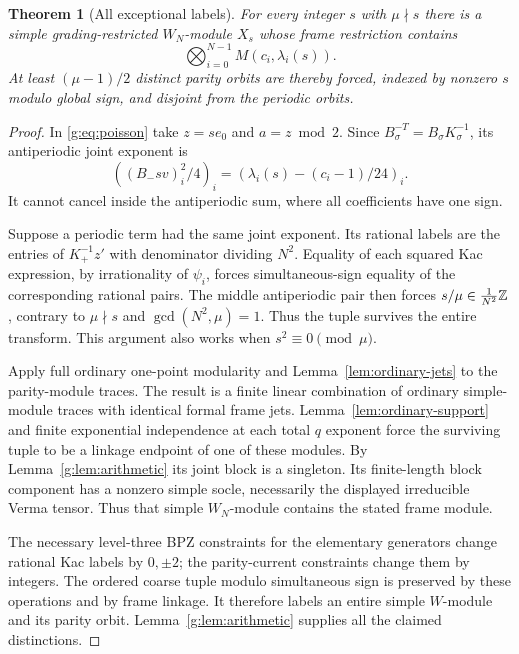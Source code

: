 \documentclass[11pt,a4paper]{article}
\numberwithin{equation}{section}
\newtheorem{theorem}{Theorem}[section]
\theoremstyle{definition}\newtheorem{definition}[theorem]{Definition}
\theoremstyle{remark}\newtheorem{remark}[theorem]{Remark}
\begin{document}
\begin{theorem}[All exceptional labels]\label{g:thm:alllabels}
For every integer $s$ with $\mu\nmid s$ there is a simple
grading-restricted $W_N$-module $X_s$ whose frame restriction contains
\[
       \bigotimes_{i=0}^{N-1} M(c_i,\lambda_i(s)).
\]
At least $(\mu-1)/2$ distinct parity orbits are thereby forced,
indexed by nonzero $s$ modulo global sign, and disjoint from the
periodic orbits.
\end{theorem}
\begin{proof}
In \eqref{g:eq:poisson} take $z=se_0$ and $a=z\bmod2$.
Since
$B_\sigma^{-T}=B_\sigma K_\sigma^{-1}$,
its antiperiodic joint exponent is
\[
       \left((B_-sv)_i^2/4\right)_i
       =\left(\lambda_i(s)-(c_i-1)/24\right)_i.
\]
It cannot cancel inside the antiperiodic sum, where all coefficients
have one sign.

Suppose a periodic term had the same joint exponent. Its rational
labels are the entries of $K_+^{-1}z'$ with denominator dividing
$N^2$. Equality of each squared Kac expression, by irrationality
of $\psi_i$, forces simultaneous-sign equality of the corresponding
rational pairs. The middle antiperiodic pair then forces
$s/\mu\in\frac1{N^2}\mathbb Z$, contrary to $\mu\nmid s$ and
$\gcd(N^2,\mu)=1$. Thus the tuple survives the entire transform.
This argument also works when $s^2\equiv0\pmod\mu$.

Apply full ordinary one-point modularity and
Lemma~\ref{lem:ordinary-jets} to the parity-module traces.
The result is a finite linear combination of ordinary simple-module
traces with identical formal frame jets. Lemma~\ref{lem:ordinary-support}
and finite exponential independence at each total $q$ exponent force
the surviving tuple to be a linkage endpoint of one of these modules.
By Lemma~\ref{g:lem:arithmetic} its joint block is a singleton. Its
finite-length block component has a nonzero simple socle, necessarily
the displayed irreducible Verma tensor. Thus that simple $W_N$-module
contains the stated frame module.

The necessary level-three BPZ constraints for the elementary
generators change rational Kac labels by $0,\pm2$; the parity-current
constraints change them by integers. The ordered coarse tuple modulo simultaneous sign is preserved by
these operations and by frame linkage. It therefore labels an
entire simple $W$-module and its parity orbit.
Lemma~\ref{g:lem:arithmetic} supplies all the claimed distinctions.
\end{proof}
\end{document}
